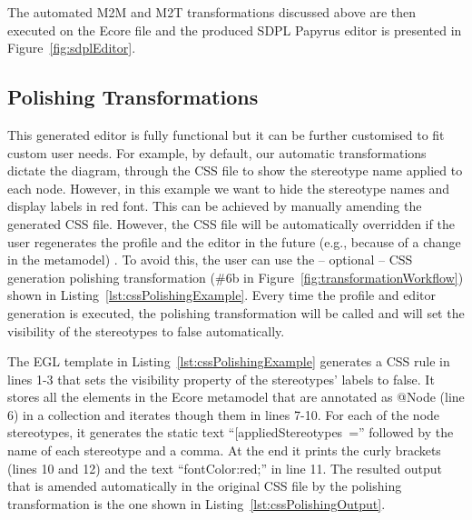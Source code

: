 The automated M2M and M2T transformations discussed above are then executed on the Ecore file and the produced SDPL Papyrus editor is presented in Figure~\ref{fig:sdplEditor}. 

\subsection{Polishing Transformations}
This generated editor is fully functional but it can be further customised to 
fit custom user needs. For example, by default, our automatic transformations 
dictate the diagram, through the CSS file to show the stereotype name applied 
to each node. However, in this example we want to hide the stereotype names and 
display labels in red font. This can be achieved by manually amending the 
generated CSS file. However, the CSS file will be automatically overridden if 
the user regenerates the profile and the editor in the future (e.g., because of 
a change in the metamodel) . To avoid this, the user can use the -- optional 
-- CSS generation polishing transformation (\#6b in 
Figure~\ref{fig:transformationWorkflow}) shown in 
Listing~\ref{lst:cssPolishingExample}. Every time the profile and editor 
generation is executed, the polishing transformation will be called and will 
set the visibility of the stereotypes to false automatically. 

\begin{figure}[t]
	
	
	\vspace*{-6mm}
\end{figure}


The EGL template in Listing~\ref{lst:cssPolishingExample} generates a CSS rule 
in lines 1-3 that sets the visibility property of the stereotypes' labels to 
false. It stores all the elements in the Ecore metamodel that are annotated as 
@Node (line 6) in a collection and iterates though them in lines 7-10. For 
each of the node stereotypes, it generates the static text 
``[appliedStereotypes~='' followed by the name of each stereotype and a comma. 
At the end it prints the curly brackets (lines 10 and 12) and the text 
``fontColor:red;'' in line 11. The resulted output that is amended 
automatically in the original CSS file by the polishing transformation is the 
one shown in Listing~\ref{lst:cssPolishingOutput}.

